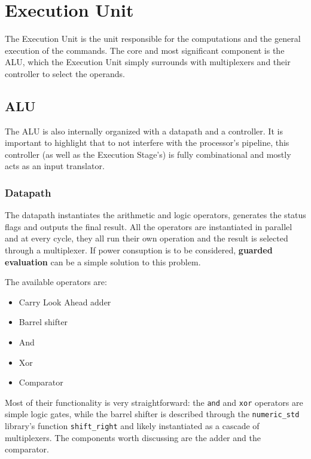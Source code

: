 \section{Execution Unit}
The Execution Unit is the unit responsible for the computations and the general execution of the commands.
The core and most significant component is the ALU, which the Execution Unit simply surrounds with multiplexers
and their controller to select the operands.

\subsection{ALU}
The ALU is also internally organized with a datapath and a controller. It is important to highlight that to not
interfere with the processor's pipeline, this controller (as well as the Execution Stage's) is fully combinational and
mostly acts as an input translator.

\subsubsection{Datapath}
The datapath instantiates the arithmetic and logic operators, generates the status flags and outputs the final result.
All the operators are instantiated in parallel and at every cycle, they all run their own operation and the result
is selected through a multiplexer. If power consuption is to be considered, \textbf{guarded evaluation} can be a simple
solution to this problem.

The available operators are:
\begin{itemize}
    \item Carry Look Ahead adder
    \item Barrel shifter
    \item And
    \item Xor
    \item Comparator
\end{itemize}

Most of their functionality is very straightforward: the \texttt{and} and \texttt{xor} operators are simple logic gates,
while the barrel shifter is described through the \texttt{numeric\_std} library's function \texttt{shift\_right} and
likely instantiated as a cascade of multiplexers. The components worth discussing are the adder and the comparator.

